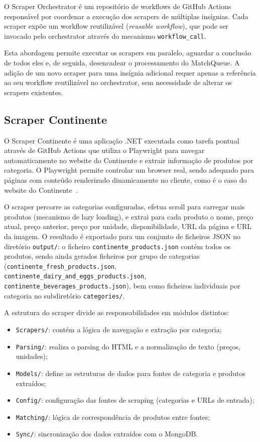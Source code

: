 O Scraper Orchestrator é um repositório de workflows de GitHub Actions responsável por coordenar a execução dos scrapers de múltiplas insígnias. Cada scraper expõe um workflow reutilizável (\textit{reusable workflow}), que pode ser invocado pelo orchestrator através do mecanismo \texttt{workflow\_call}.

Esta abordagem permite executar os scrapers em paralelo, aguardar a conclusão de todos eles e, de seguida, desencadear o processamento do MatchQueue. A adição de um novo scraper para uma insígnia adicional requer apenas a referência ao seu workflow reutilizável no orchestrator, sem necessidade de alterar os scrapers existentes.

\subsection{Scraper Continente}
\label{sec:4.3.2}

O Scraper Continente é uma aplicação .NET executada como tarefa pontual através de GitHub Actions que utiliza o Playwright para navegar automaticamente no website do Continente e extrair informação de produtos por categoria. O Playwright permite controlar um browser real, sendo adequado para páginas com conteúdo renderizado dinamicamente no cliente, como é o caso do website do Continente~\cite{playwright-docs}.

O scraper percorre as categorias configuradas, efetua scroll para carregar mais produtos (mecanismo de lazy loading), e extrai para cada produto o nome, preço atual, preço anterior, preço por unidade, disponibilidade, \ac{URL} da página e \ac{URL} da imagem. O resultado é exportado para um conjunto de ficheiros JSON no diretório \texttt{output/}: o ficheiro \texttt{continente\_products.json} contém todos os produtos, sendo ainda gerados ficheiros por grupo de categorias (\texttt{continente\_fresh\_products.json}, \texttt{continente\_dairy\_and\_eggs\_products.json}, \texttt{continente\_beverages\_products.json}), bem como ficheiros individuais por categoria no subdiretório \texttt{categories/}.

A estrutura do scraper divide as responsabilidades em módulos distintos:
\begin{itemize}
    \item \texttt{Scrapers/}: contém a lógica de navegação e extração por categoria;
    \item \texttt{Parsing/}: realiza o parsing do HTML e a normalização de texto (preços, unidades);
    \item \texttt{Models/}: define as estruturas de dados para fontes de categoria e produtos extraídos;
    \item \texttt{Config/}: configuração das fontes de scraping (categorias e URLs de entrada);
    \item \texttt{Matching/}: lógica de correspondência de produtos entre fontes;
    \item \texttt{Sync/}: sincronização dos dados extraídos com o MongoDB.
\end{itemize}

